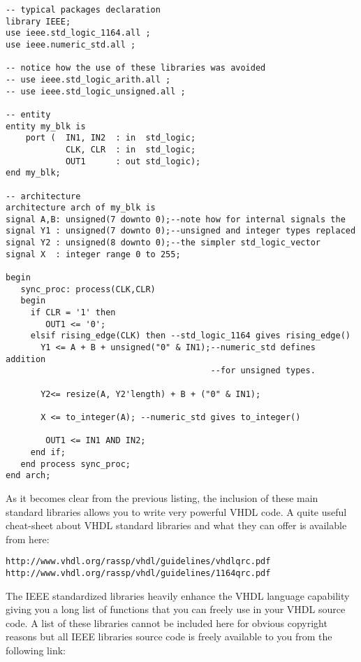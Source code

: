 \noindent
\begin{minipage}{0.99\linewidth}
\begin{lstlisting}[label=good_lib_ex, caption=Example of operators and types available with some IEEE packages.]
-- typical packages declaration
library IEEE;
use ieee.std_logic_1164.all ;
use ieee.numeric_std.all ;

-- notice how the use of these libraries was avoided
-- use ieee.std_logic_arith.all ;
-- use ieee.std_logic_unsigned.all ;

-- entity
entity my_blk is 
    port (  IN1, IN2  : in  std_logic;
            CLK, CLR  : in  std_logic; 
            OUT1      : out std_logic); 
end my_blk;

-- architecture
architecture arch of my_blk is
signal A,B: unsigned(7 downto 0);--note how for internal signals the
signal Y1 : unsigned(7 downto 0);--unsigned and integer types replaced
signal Y2 : unsigned(8 downto 0);--the simpler std_logic_vector
signal X  : integer range 0 to 255;

begin
   sync_proc: process(CLK,CLR)
   begin
     if CLR = '1' then 
        OUT1 <= '0';  
     elsif rising_edge(CLK) then --std_logic_1164 gives rising_edge()
       Y1 <= A + B + unsigned("0" & IN1);--numeric_std defines addition
                                         --for unsigned types.

       Y2<= resize(A, Y2'length) + B + ("0" & IN1);
  
       X <= to_integer(A); --numeric_std gives to_integer()

        OUT1 <= IN1 AND IN2; 
     end if; 
   end process sync_proc; 
end arch;
\end{lstlisting}
\end{minipage}

As it becomes clear from the previous listing, the inclusion of these main standard libraries allows you to write very powerful VHDL code. A quite useful cheat-sheet about VHDL standard libraries and what they can offer is available from here:

\noindent
\begin{verbatim}
http://www.vhdl.org/rassp/vhdl/guidelines/vhdlqrc.pdf
http://www.vhdl.org/rassp/vhdl/guidelines/1164qrc.pdf
\end{verbatim}

The IEEE standardized libraries heavily enhance the VHDL language capability giving you a long list of functions that you can freely use in your VHDL source code. A list of these libraries cannot be included here for obvious copyright reasons but all IEEE libraries source code is freely available to you from the following link:

